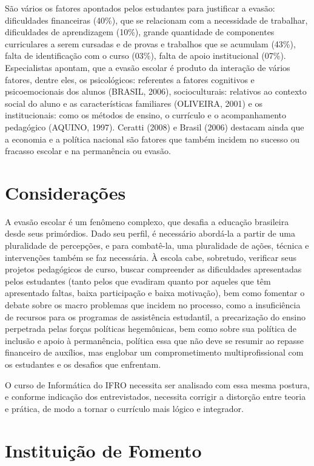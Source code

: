 \documentclass[article,12pt,onesidea,4paper,english,brazil]{abntex2}
\begin{document}
	São vários os fatores apontados pelos estudantes para justificar a evasão: dificuldades financeiras (40\%), que se relacionam com a necessidade de trabalhar, dificuldades de aprendizagem (10\%), grande quantidade de componentes curriculares a serem cursadas e de provas e trabalhos que se acumulam (43\%), falta de identificação com o curso (03\%), falta de apoio institucional (07\%). Especialistas apontam, que a evasão escolar é produto da interação de vários fatores, dentre eles, os psicológicos: referentes a fatores cognitivos e psicoemocionais dos alunos (BRASIL, 2006), socioculturais: relativos ao contexto social do aluno e as características familiares (OLIVEIRA, 2001) e os institucionais: como os métodos de ensino, o currículo e o acompanhamento pedagógico (AQUINO, 1997). Ceratti (2008) e Brasil (2006) destacam ainda que a economia e a política nacional são fatores que também incidem no sucesso ou fracasso escolar e na permanência ou evasão.
	
	\section*{Considerações}

A evasão escolar é um fenômeno complexo, que desafia a educação brasileira desde seus primórdios. Dado seu perfil, é necessário abordá-la a partir de uma pluralidade de percepções, e para combatê-la, uma pluralidade de ações, técnica e intervenções também se faz necessária. À escola cabe, sobretudo,  verificar seus projetos pedagógicos de curso, buscar compreender as dificuldades apresentadas pelos estudantes (tanto pelos que evadiram quanto por aqueles que têm apresentado faltas, baixa participação e baixa motivação), bem como fomentar o debate sobre os macro problemas que incidem no processo, como a insuficiência de recursos para os programas de assistência estudantil, a precarização do ensino perpetrada pelas forças políticas hegemônicas, bem como sobre sua política de inclusão e apoio à permanência, política essa que não deve se resumir ao repasse financeiro de auxílios, mas englobar um comprometimento multiprofissional com os estudantes e os desafios que enfrentam.

O curso de Informática do IFRO necessita ser analisado com essa mesma postura, e conforme indicação dos entrevistados, necessita corrigir a distorção entre teoria e prática, de modo a tornar o currículo mais lógico e integrador.

	
	\section*{Instituição de Fomento}
	
\end{document}
